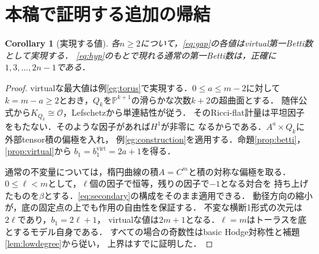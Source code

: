 \documentclass[12pt]{amsart}
\newtheorem{cor}[thm]{Corollary}
\theoremstyle{definition}
\theoremstyle{remark}
\numberwithin{equation}{section}
\newcommand{\cO}{\mathcal{O}}
\newcommand{\mP}{\mathbb{P}}
\newcommand{\virt}{\mathrm{virt}}
\begin{document}
\section{本稿で証明する追加の帰結}\label{sec:extra}
\begin{cor}[実現する値]\label{cor:values}
各$n\geq2$について，\eqref{eq:gap}の各値はvirtual第一Betti数として実現する．
\eqref{eq:hyp}のもとで現れる通常の第一Betti数は，正確に$1,3,\ldots,2n-1$である．
\end{cor}
\begin{proof}
virtualな最大値は例\ref{eg:torus}で実現する．$0\leq a\leq m-2$に対して
$k=m-a\geq2$とおき，$Q_k$を$\mP^{k+1}$の滑らかな次数$k+2$の超曲面とする．
随伴公式から$K_{Q_k}\cong\cO$，Lefschetzから単連結性が従う．
そのRicci-flat計量は平坦因子をもたない．そのような因子があれば$H^1$が非零に
なるからである．$A^a\times Q_k$に外部tensor積の偏極を入れ，
例\ref{eg:construction}を適用する．命題\ref{prop:betti}，\ref{prop:virtual}から
$b_1=b_1^{\virt}=2a+1$を得る．

通常の不変量については，楕円曲線の積$A=C^m$と積の対称な偏極を取る．
$0\leq\ell<m$として，$\ell$個の因子で恒等，残りの因子で$-1$となる対合を
持ち上げたものを$\beta$とする．\eqref{eq:secondary}の構成をそのまま適用できる．
動径方向の縮小が，底の固定点の上でも作用の自由性を保証する．
不変な横断1形式の次元は$2\ell$であり，$b_1=2\ell+1$，
virtualな値は$2m+1$となる．$\ell=m$はトーラスを底とするモデル自身である．
すべての場合の奇数性はbasic Hodge対称性と補題\ref{lem:lowdegree}から従い，
上界はすでに証明した．
\end{proof}
\end{document}
